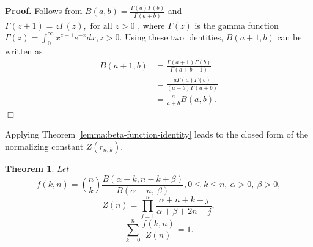 \documentclass[officiallayout]{tktla}
\newtheorem{theorem}{Theorem}[chapter]
\newenvironment{proof}{\noindent\textbf{Proof.} }{$\Box$}
\begin{document}
\begin{proof}
  Follows from $B\left(a, b\right) = \frac{\Gamma\left(a\right)\Gamma\left(b\right)}{\Gamma\left(a + b\right)}$ \citep{artin_einfuhrung} and $\Gamma\left(z + 1\right) = z\Gamma\left(z\right), \text{ for all } z > 0$ \citep{davis_leonhard}, where $\Gamma\left(z\right)$ is the gamma function $\Gamma\left(z\right) = \int_{0}^{\infty}x^{z - 1}e^{-x}dx, z > 0$. Using these two identities, $B\left(a + 1, b\right)$ can be written as
  \begin{align*}
    B\left(a + 1, b\right) &= \frac{\Gamma\left(a + 1\right)\Gamma\left(b\right)}{\Gamma\left(a + b + 1\right)} \\
    &= \frac{a\Gamma\left(a\right)\Gamma\left(b\right)}{\left(a + b\right)\Gamma\left(a + b\right)} \\
    &= \frac{a}{a + b}B\left(a, b\right).
  \end{align*}
\end{proof}

Applying Theorem \eqref{lemma:beta-function-identity} leads to the closed form of the normalizing constant $Z\left(r_{n, k}\right)$.
\begin{theorem}
  \label{theorem:likelihood-can-be-normalized}
  Let
  \[
  f\left(k, n\right) = \binom{n}{k}\frac{B\left(\alpha + k, n - k + \beta\right)}{B\left(\alpha + n, \: \beta\right)}, 0 \leq k \leq n, \: \alpha > 0, \: \beta > 0,
  \]
  \[
  Z\left(n\right) = \prod_{j = 1}^{n}\frac{\alpha + n + k - j}{\alpha + \beta + 2n - j},
  \]
  \[
  \sum_{k = 0}^{n}\frac{f\left(k, n\right)}{Z\left(n\right)} = 1.
  \]
\end{theorem}
\end{document}
